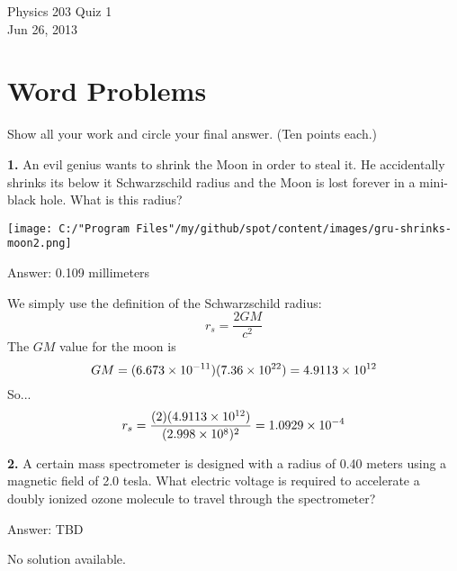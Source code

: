 \documentclass{article}
\begin{document}
\setcounter{page}{1}


\begin{center}
\LARGE{Physics 203 Quiz 1} \\[2mm]
\small{\sf Jun 26, 2013}
\end{center}

\thispagestyle{empty}

\section*{Word Problems}
Show all your work and circle your final answer. (Ten points each.) \par


\textbf{1.} \quad An evil genius wants to shrink the Moon in order to steal it. He
accidentally shrinks its below it Schwarzschild radius and the Moon
is lost forever in a mini-black hole. What is this radius?


\begin{center}
\texttt{[image: C:/"Program Files"/my/github/spot/content/images/gru-shrinks-moon2.png]}

\label{fig:gru-shrinks-moon2-png}
\end{center}
\par {\footnotesize\sf Answer: 0.109 millimeters}
\par We simply use the definition of the Schwarzschild radius:
%
\begin{equation*}
r_s = \frac{2GM}{c^2}
\end{equation*}
The $GM$ value for the moon is
%
\begin{equation*}
GM = (6.673 \times 10^{-11})(7.36 \times 10^{22})
= 4.9113 \times 10^{12}
\end{equation*}
So...
%
\begin{equation*}
r_s = \frac{(2)(4.9113 \times 10^{12})}{(2.998 \times 10^{8})^2}
= 1.0929 \times 10^{-4}
\end{equation*}
\newpage

\textbf{2.} \quad A certain mass spectrometer is designed with a radius of 0.40 meters using a magnetic field of 2.0 tesla. What electric voltage is required to accelerate a doubly ionized ozone molecule to travel through the spectrometer?
\par {\footnotesize\sf Answer: TBD}
\par No solution available.
\newpage
\end{document}
